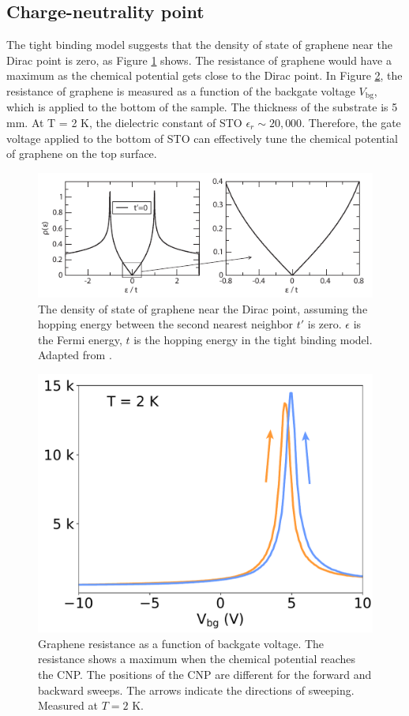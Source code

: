 \documentclass[pdflatex, sectionletters, 12pt, final, phd]{pittetd}    %
\begin{document}
\subsection{Charge-neutrality point}

The tight binding model suggests that the density of state of graphene near the Dirac point is zero\cite{neto2009electronic}, as Figure \ref{FIG:DOS} shows. The resistance of graphene would have a maximum as the chemical potential gets close to the Dirac point. In Figure \ref{FIG:DiracPeak}, the resistance of graphene is measured as a function of the backgate voltage $V_\mathrm{bg}$, which is applied to the bottom of the sample. The thickness of the substrate is 5 mm. At T = 2 K, the dielectric constant of STO $\epsilon_r \sim 20,000$. Therefore, the gate voltage applied to the bottom of STO can effectively tune the chemical potential of graphene on the top surface. 

\begin{figure}[h!]
	\centering
	\vspace{0.85cm}
	\includegraphics[width=.9\textwidth]{Drawing/DOS.pdf}
	\caption[The density of state of graphene near the Dirac point]{The density of state of graphene near the Dirac point, assuming the hopping energy between the second nearest neighbor $t'$ is zero. $\epsilon$ is the Fermi energy, $t$ is the hopping energy in the tight binding model. Adapted from \cite{neto2009electronic}.}
	\label{FIG:DOS}
\end{figure}

\begin{figure}[h!]
	\centering
	\includegraphics[width=.5\textwidth]{Drawing/DiracPeak.pdf}
	\caption[Graphene resistance as a function of backgate voltage]{Graphene resistance as a function of backgate voltage. The resistance shows a maximum when the chemical potential reaches the CNP. The positions of the CNP are different for the forward and backward sweeps. The arrows indicate the directions of sweeping. Measured at $T = 2$ K.}
	\label{FIG:DiracPeak}
\end{figure}
\end{document}
